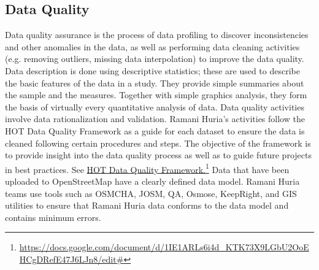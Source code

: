 \documentclass[a4paper,12pt,twoside]{article}
\begin{document}
\subsection{Data Quality}
\begin{multicols}{2}
Data quality assurance is the process of data profiling to discover inconsistencies and other anomalies in the data, as well as performing data cleaning activities (e.g. removing outliers, missing data interpolation) to improve the data quality. Data description is done using descriptive statistics; these are used to describe the basic features of the data in a study. They provide simple summaries about the sample and the measures. Together with simple graphics analysis, they form the basis of virtually every quantitative analysis of data.
Data quality activities involve data rationalization and validation. Ramani Huria's activities follow the HOT Data Quality Framework as a guide for each dataset to ensure the data is cleaned following certain procedures and steps. The objective of the framework is to provide insight into the data quality process as well as to guide future projects in best practices. See \href{https://docs.google.com/document/d/1IE1ARLs6i4d_KTK73X9LGbU2OoEHCgDRefE47J6LJn8/edit#}{HOT Data Quality Framework.}\footnote{\url{https://docs.google.com/document/d/1IE1ARLs6i4d_KTK73X9LGbU2OoEHCgDRefE47J6LJn8/edit#}}
Data that have been uploaded to OpenStreetMap have a clearly defined data model. Ramani Huria teams use tools such as OSMCHA, JOSM, QA, Osmose, KeepRight, and GIS utilities to ensure that Ramani Huria data conforms to the data model and contains minimum errors.
\end{multicols}
\end{document}
